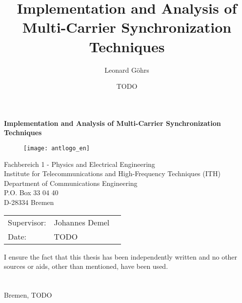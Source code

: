 \newcommand{\mytitle}{Implementation and Analysis of Multi-Carrier Synchronization Techniques}
\newcommand{\myname}{Leonard Göhrs}
\newcommand{\mysupervisor}{Johannes Demel}
\newcommand{\mysubdate}{TODO}

\thispagestyle{empty}
\title{\mytitle}
\author{\myname}
\date{\mysubdate}

\begin{titlepage}
  \noindent

  \vspace{55 mm}

  \begin{center}
    \begin{huge}
      \textbf{\mytitle}
    \end{huge}
  \end{center}

  \vspace{55 mm}

  \begin{figure}[H]
    \centering
    \texttt{[image: antlogo\_en]}
    \\
    \label{img:FrontPage}
  \end{figure}

  \begin{center}
    Fachbereich 1 - Physics and Electrical Engineering \\
    Institute for Telecommunications and High-Frequency Techniques (ITH) \\
    Department of Communications Engineering \\
    P.O. Box 33 04 40 \\
    D-28334 Bremen \\
  \end{center}

  \vfill

  \begin{center}
    \begin{tabular}{lll}
      Supervisor: & \mysupervisor \\
      Date: & \mysubdate
    \end{tabular}
  \end{center}

  \vspace{5mm}
  \noindent I ensure the fact that this thesis has been independently written and no other
  sources or aids, other than mentioned, have been used. \\ \\ \\
  Bremen, \mysubdate \hspace{5mm} \hrulefill

  \newpage
\end{titlepage}
